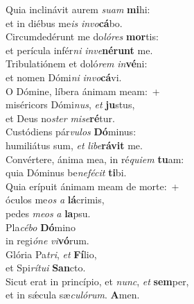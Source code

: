 \evenverse Quia inclinávit aurem \textit{su}\textit{am} \textbf{mi}hi:~\*\\
\evenverse et in diébus me\textit{is} \textit{in}\textit{vo}\textbf{cá}bo.\\
\oddverse Circumdedérunt me do\textit{ló}\textit{res} \textbf{mor}tis:~\*\\
\oddverse et perícula infér\textit{ni} \textit{in}\textit{ve}\textbf{né}\textbf{runt} me.\\
\evenverse Tribulatiónem et doló\textit{rem} \textit{in}\textbf{vé}ni:~\*\\
\evenverse et nomen Dómi\textit{ni} \textit{in}\textit{vo}\textbf{cá}vi.\\
\oddverse O Dómine, líbera ánimam meam:~+\\
\oddverse  miséricors Dómi\textit{nus}, \textit{et} \textbf{ju}stus,~\*\\
\oddverse et Deus no\textit{ster} \textit{mi}\textit{se}\textbf{ré}tur.\\
\evenverse Custódiens pár\textit{vu}\textit{los} \textbf{Dó}minus:~\*\\
\evenverse humiliátus sum, \textit{et} \textit{li}\textit{be}\textbf{rá}\textbf{vit} me.\\
\oddverse Convértere, ánima mea, in ré\textit{qui}\textit{em} \textbf{tu}am:~\*\\
\oddverse quia Dóminus be\textit{ne}\textit{fé}\textit{cit} \textbf{ti}bi.\\
\evenverse Quia erípuit ánimam meam de morte:~+\\
\evenverse  óculos me\textit{os} \textit{a} \textbf{lá}crimis,~\*\\
\evenverse pedes \textit{me}\textit{os} \textit{a} \textbf{la}psu.\\
\oddverse Pla\textit{cé}\textit{bo} \textbf{Dó}mino~\*\\
\oddverse in regi\textit{ó}\textit{ne} \textit{vi}\textbf{vó}rum.\\
\evenverse Glória Pa\textit{tri}, \textit{et} \textbf{Fí}lio,~\*\\
\evenverse et Spi\textit{rí}\textit{tu}\textit{i} \textbf{San}cto.\\
\oddverse Sicut erat in princípio, et \textit{nunc}, \textit{et} \textbf{sem}per,~\*\\
\oddverse et in sǽcula sæ\textit{cu}\textit{ló}\textit{rum}. \textbf{A}men.\\
